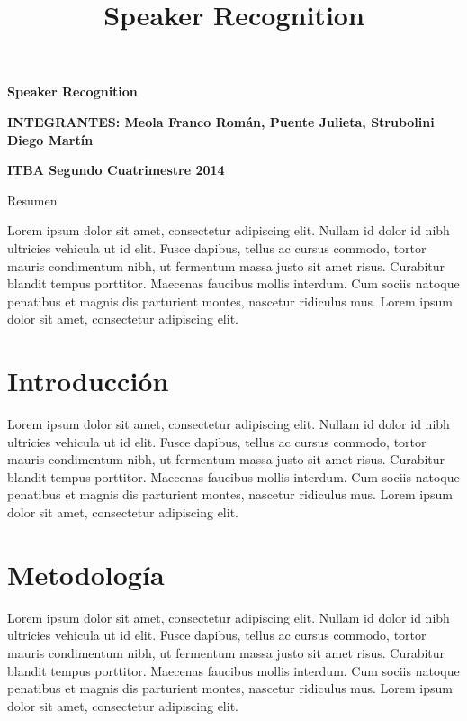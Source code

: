 \documentclass[a4paper,10pt]{article}
\title{Speaker Recognition}
\begin{document}
\begin{center}
\textbf{\Huge{Speaker Recognition}}
\end{center}

\begin{center}
\textbf{INTEGRANTES: Meola Franco Román, Puente Julieta, Strubolini Diego Martín}

\textbf{ITBA Segundo Cuatrimestre 2014}
\end{center}

\begin{center}
\end{center}

\begin{center}
\begin{large}
Resumen
\end{large}
\end{center}

Lorem ipsum dolor sit amet, consectetur adipiscing elit. Nullam id dolor id nibh ultricies vehicula ut id elit. Fusce dapibus, tellus ac cursus commodo, tortor mauris condimentum nibh, ut fermentum massa justo sit amet risus. Curabitur blandit tempus porttitor. Maecenas faucibus mollis interdum. Cum sociis natoque penatibus et magnis dis parturient montes, nascetur ridiculus mus. Lorem ipsum dolor sit amet, consectetur adipiscing elit.

\section{Introducción}
Lorem ipsum dolor sit amet, consectetur adipiscing elit. Nullam id dolor id nibh ultricies vehicula ut id elit. Fusce dapibus, tellus ac cursus commodo, tortor mauris condimentum nibh, ut fermentum massa justo sit amet risus. Curabitur blandit tempus porttitor. Maecenas faucibus mollis interdum. Cum sociis natoque penatibus et magnis dis parturient montes, nascetur ridiculus mus. Lorem ipsum dolor sit amet, consectetur adipiscing elit.

\section{Metodología}
Lorem ipsum dolor sit amet, consectetur adipiscing elit. Nullam id dolor id nibh ultricies vehicula ut id elit. Fusce dapibus, tellus ac cursus commodo, tortor mauris condimentum nibh, ut fermentum massa justo sit amet risus. Curabitur blandit tempus porttitor. Maecenas faucibus mollis interdum. Cum sociis natoque penatibus et magnis dis parturient montes, nascetur ridiculus mus. Lorem ipsum dolor sit amet, consectetur adipiscing elit.
\end{document}
